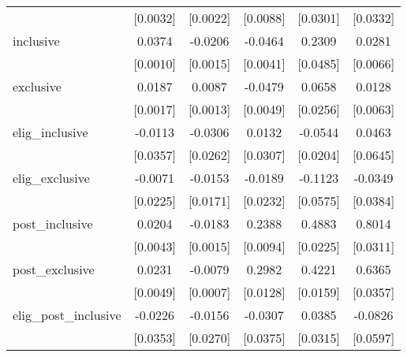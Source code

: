 \begin{table}[htbp]
\begin{tabular}{l*{5}{c}}
                    &    [0.0032]         &    [0.0022]         &    [0.0088]         &    [0.0301]         &    [0.0332]         \\
\addlinespace
inclusive           &      0.0374\sym{***}&     -0.0206\sym{***}&     -0.0464\sym{***}&      0.2309\sym{***}&      0.0281\sym{***}\\
                    &    [0.0010]         &    [0.0015]         &    [0.0041]         &    [0.0485]         &    [0.0066]         \\
\addlinespace
exclusive           &      0.0187\sym{***}&      0.0087\sym{***}&     -0.0479\sym{***}&      0.0658\sym{**} &      0.0128\sym{**} \\
                    &    [0.0017]         &    [0.0013]         &    [0.0049]         &    [0.0256]         &    [0.0063]         \\
\addlinespace
elig\_inclusive      &     -0.0113         &     -0.0306         &      0.0132         &     -0.0544\sym{**} &      0.0463         \\
                    &    [0.0357]         &    [0.0262]         &    [0.0307]         &    [0.0204]         &    [0.0645]         \\
\addlinespace
elig\_exclusive      &     -0.0071         &     -0.0153         &     -0.0189         &     -0.1123\sym{*}  &     -0.0349         \\
                    &    [0.0225]         &    [0.0171]         &    [0.0232]         &    [0.0575]         &    [0.0384]         \\
\addlinespace
post\_inclusive      &      0.0204\sym{***}&     -0.0183\sym{***}&      0.2388\sym{***}&      0.4883\sym{***}&      0.8014\sym{***}\\
                    &    [0.0043]         &    [0.0015]         &    [0.0094]         &    [0.0225]         &    [0.0311]         \\
\addlinespace
post\_exclusive      &      0.0231\sym{***}&     -0.0079\sym{***}&      0.2982\sym{***}&      0.4221\sym{***}&      0.6365\sym{***}\\
                    &    [0.0049]         &    [0.0007]         &    [0.0128]         &    [0.0159]         &    [0.0357]         \\
\addlinespace
elig\_post\_inclusive &     -0.0226         &     -0.0156         &     -0.0307         &      0.0385         &     -0.0826         \\
                    &    [0.0353]         &    [0.0270]         &    [0.0375]         &    [0.0315]         &    [0.0597]         \\

\end{tabular}
\end{table}
